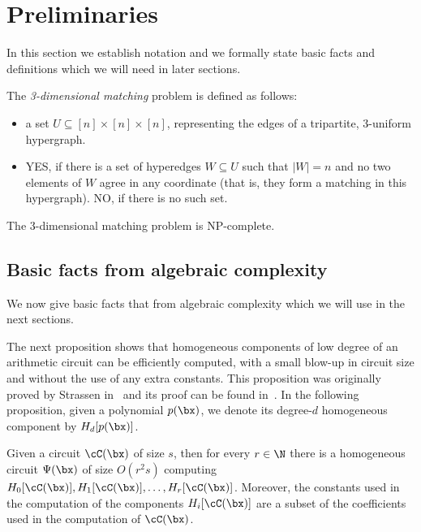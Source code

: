 \setcounter{section}{1}
\section{Preliminaries}
\setcounter{theorem}{15}
%

In this section we establish notation and we formally state basic facts and definitions which
we will need in later sections.



\begin{definition}\label{def:3D-matching}
	The \emph{3-dimensional matching} problem is defined as follows:
	\begin{itemize}
		\item[Input:] a set $U \subseteq [n] \times [n] \times [n]$, representing the edges of
		a tripartite, 3-uniform hypergraph.
		\item[Output:] YES, if there is a set of hyperedges $W \subseteq U$ such that $|W| = n$ and
		no two elements of $W$ agree in any coordinate (that is, they form a matching in this
		hypergraph). NO, if there is no such set.
	\end{itemize}
\end{definition}

\begin{theorem}\label{thm:3D-matching-NP-complete}
	The 3-dimensional matching problem is NP-complete.
\end{theorem}

\subsection{Basic facts from algebraic complexity}

We now give basic facts that from algebraic complexity which we will use in the next sections.

The next proposition shows that homogeneous components of low degree
of an arithmetic circuit can be efficiently computed, with a small blow-up
in circuit size and without the use of any extra constants. This proposition was
originally proved by Strassen in~\cite{S73} and its proof can be found
in~\cite[Theorem 2.2]{SY10}.
In the following proposition, given a polynomial $p(\bx)$, we denote its degree-$d$ homogeneous component by $H_d[p(\bx)]$.

\begin{proposition}\label{prop:hom-components}
	Given a circuit $\cC(\bx)$ of size $s$, then for every $r \in \N$
	there is a homogeneous circuit $\Psi(\bx)$ of size $O(r^2 s)$
	computing $H_0[\cC(\bx)], H_1[\cC(\bx)], \ldots, H_r[\cC(\bx)]$.
	Moreover, the constants used in the computation of the components $H_i[\cC(\bx)]$
	are a subset of the coefficients used in the computation of $\cC(\bx)$.
%
%
\end{proposition}

